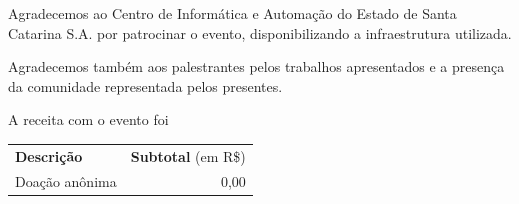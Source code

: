 \documentclass[12pt]{article}
\begin{document}

Agradecemos ao Centro de Informática e Automação do Estado de Santa Catarina
S.A. por patrocinar o evento, disponibilizando a infraestrutura utilizada.

Agradecemos também aos palestrantes pelos trabalhos apresentados e a presença da comunidade representada pelos presentes.

A receita com o evento foi

\begin{tabular}{p{}r}
  \textbf{Descrição} & \textbf{Subtotal} (em R\$) \\
  Doação anônima & 0,00 \\
\end{tabular}
\end{document}
